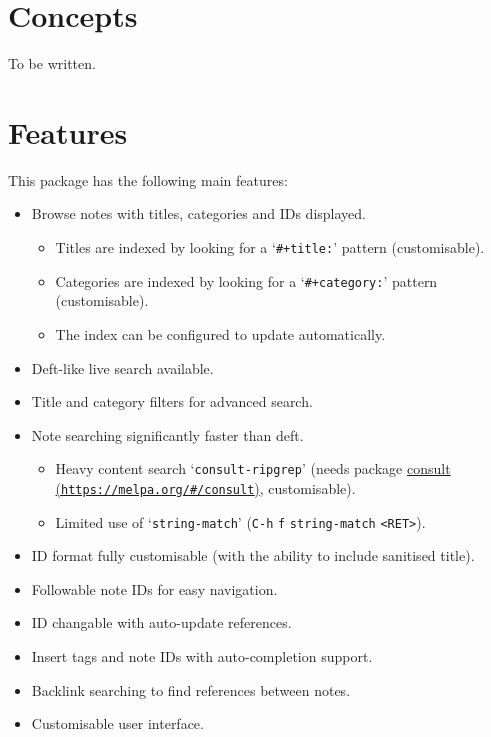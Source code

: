 \documentclass{book}
\renewcommand{\_}{\Texinfounderscore\discretionary{}{}{}}
\begin{document}
\chapter{{Concepts}}
\label{anchor:Concepts}%

To be written.

\chapter{{Features}}
\label{anchor:Features}%

This package has the following main features:
\begin{itemize}
\item Browse notes with titles, categories and IDs displayed.
\begin{itemize}
\item Titles are indexed by looking for a `\texttt{\#+title:}' pattern (customisable).
\item Categories are indexed by looking for a `\texttt{\#+category:}' pattern
(customisable).
\item The index can be configured to update automatically.
\end{itemize}
\item Deft-like live search available.
\item Title and category filters for advanced search.
\item Note searching significantly faster than deft.
\begin{itemize}
\item Heavy content search `\texttt{consult-ripgrep}' (needs package \href{https://melpa.org/\#/consult}{consult (\nolinkurl{https://melpa.org/\#/consult})},
customisable).
\item Limited use of `\texttt{string-match}' (\texttt{C-h} \texttt{f} \texttt{string-match} \texttt{<RET>}).
\end{itemize}
\item ID format fully customisable (with the ability to include sanitised title).
\item Followable note IDs for easy navigation.
\item ID changable with auto-update references.
\item Insert tags and note IDs with auto-completion support.
\item Backlink searching to find references between notes.
\item Customisable user interface.
\end{itemize}
\end{document}
